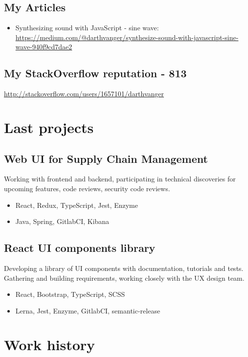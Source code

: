 \documentclass[a4paper, 14pt]{article}
\begin{document}
  \subsection{My Articles}
    \begin{itemize}
      \item Synthesizing sound with JavaScript - sine wave: \url{https://medium.com/@darthvanger/synthesize-sound-with-javascript-sine-wave-940f9cd7dae2}
    \end{itemize}

  \subsection{My StackOverflow reputation - 813}
    \url{http://stackoverflow.com/users/1657101/darthvanger}

\section{Last projects}
  \subsection{Web UI for Supply Chain Management}
  Working with frontend and backend, participating in technical discoveries for upcoming features, code reviews, security code reviews.
    \begin{itemize}
      \item React, Redux, TypeScript, Jest, Enzyme \\
      \item Java, Spring, GitlabCI, Kibana
    \end{itemize}
  \subsection{React UI components library}
    Developing a library of UI components with documentation, tutorials and tests. \\
    Gathering and building requirements, working closely with the UX design team.
    \begin{itemize}
      \item React, Bootstrap, TypeScript, SCSS \\ 
      \item Lerna, Jest, Enzyme, GitlabCI, semantic-release
    \end{itemize}

\section{Work history}
\end{document}
